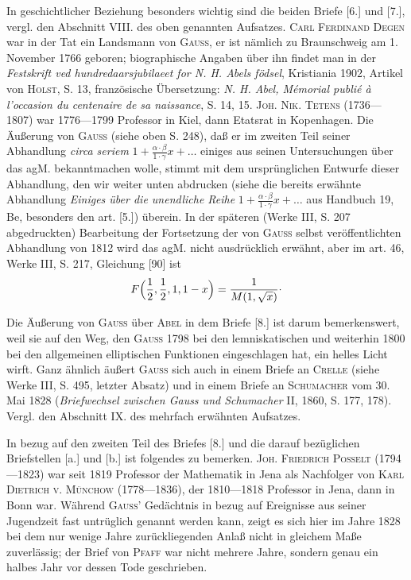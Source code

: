 \clearpage
{}
\par\indent In geschichtlicher Beziehung besonders wichtig sind die beiden Briefe [6.] und [7.], vergl. den Abschnitt VIII. des oben genannten Aufsatzes. \textsc{Carl Ferdinand Degen} war in der Tat ein Landsmann von \textsc{Gauss}, er ist nämlich zu Braunschweig am 1. November 1766 geboren; biographische Angaben über ihn findet man in der \textit{Festskrift ved hundredaarsjubilaeet for N. H. Abels födsel}, Kristiania 1902, Artikel von \textsc{Holst}, S. 13, französische Übersetzung: \textit{N. H. Abel, Mémorial publié à l’occasion du centenaire de sa naissance}, S. 14, 15. \textsc{Joh. Nik. Tetens} (1736—1807) war 1776—1799 Professor in Kiel, dann Etatsrat in Kopenhagen. Die Äußerung von \textsc{Gauss} (siehe oben S. 248), daß er im zweiten Teil seiner Abhandlung \textit{circa seriem} $1+\frac{\alpha\cdot\beta}{1\cdot\gamma}x+\ldots$ einiges aus seinen Untersuchungen über das agM. bekanntmachen wolle, stimmt mit dem ursprünglichen Entwurfe dieser Abhandlung, den wir weiter unten abdrucken (siehe die bereits erwähnte Abhandlung \textit{Einiges über die unendliche Reihe} $1+\frac{\alpha\cdot\beta}{1\cdot\gamma}x+\ldots$ aus Handbuch 19, Be, besonders den art. [5.]) überein. In der späteren (Werke III, S. 207 abgedruckten) Bearbeitung der Fortsetzung der von \textsc{Gauss} selbst veröffentlichten Abhandlung von 1812 wird das agM. nicht ausdrücklich erwähnt, aber im art. 46, Werke III, S. 217, Gleichung [90] ist
\[F\Bigl(\frac12,\frac12,1,1-x\Bigr)=\frac1{M(1,\sqrt{x})}\mathpunct{\raisebox{.5ex}{.}}\]
\par\indent Die Äußerung von \textsc{Gauss} über \textsc{Abel} in dem Briefe [8.] ist darum bemerkenswert, weil sie auf den Weg, den \textsc{Gauss} 1798 bei den lemniskatischen und weiterhin 1800 bei den allgemeinen elliptischen Funktionen eingeschlagen hat, ein helles Licht wirft. Ganz ähnlich äußert \textsc{Gauss} sich auch in einem Briefe an \textsc{Crelle} (siehe Werke III, S. 495, letzter Absatz) und in einem Briefe an \textsc{Schumacher} vom 30. Mai 1828 (\textit{Briefwechsel zwischen Gauss und Schumacher} II, 1860, S. 177, 178). Vergl. den Abschnitt IX. des mehrfach erwähnten Aufsatzes.
\par\indent In bezug auf den zweiten Teil des Briefes [8.] und die darauf bezüglichen Briefstellen [a.] und [b.] ist folgendes zu bemerken. \textsc{Joh. Friedrich Posselt} (1794—1823) war seit 1819 Professor der Mathematik in Jena als Nachfolger von \textsc{Karl Dietrich v. Münchow} (1778—1836), der 1810—1818 Professor in Jena, dann in Bonn war. Während \textsc{Gauss}' Gedächtnis in bezug auf Ereignisse aus seiner Jugendzeit fast untrüglich genannt werden kann, zeigt es sich hier im Jahre 1828 bei dem nur wenige Jahre zurückliegenden Anlaß nicht in gleichem Maße zuverlässig; der Brief von \textsc{Pfaff} war nicht mehrere Jahre, sondern genau ein halbes Jahr vor dessen Tode geschrieben.

